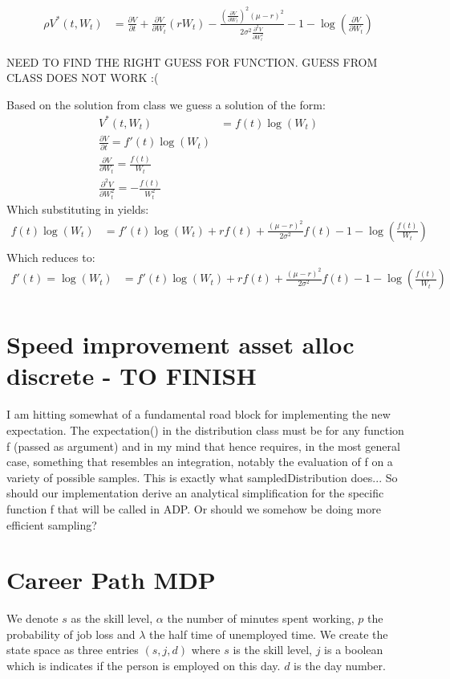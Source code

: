 \documentclass{article}[12pt]
\begin{document}
\begin{align*}
\rho V^*(t,W_t)  &= \frac{\partial V}{\partial t} + \frac{\partial V}{\partial W_t}(rW_t)-\frac{(\frac{\partial V}{\partial W_t})^2(\mu-r)^2}{2\sigma^2\frac{\partial^2 V}{\partial W_t^2}} - 1-\log(\frac{\partial V}{\partial W_t})
\end{align*}

NEED TO FIND THE RIGHT GUESS FOR FUNCTION. GUESS FROM CLASS DOES NOT WORK :( 

Based on the solution from class we guess a solution of the form:
\begin{align*}
V^*(t,W_t) &= f(t)\log(W_t) \\
\frac{\partial V}{\partial t} = f'(t)\log(W_t)\\
\frac{\partial V}{\partial W_t} = \frac{f(t)}{W_t}\\
\frac{\partial^2 V}{\partial W_t^2} = -\frac{f(t)}{W_t^2}
\end{align*}
Which substituting in yields:
\begin{align*}
f(t)\log(W_t) &=  f'(t)\log(W_t) + rf(t)+\frac{(\mu-r)^2}{2\sigma^2}f(t) - 1-\log(\frac{f(t)}{W_t})\\
\end{align*}
Which reduces to:
\begin{align*}
f'(t) = \log(W_t) &=  f'(t)\log(W_t) + rf(t)+\frac{(\mu-r)^2}{2\sigma^2}f(t) - 1-\log(\frac{f(t)}{W_t})\\
\end{align*}


\section{Speed improvement asset alloc discrete - TO FINISH}

I am hitting somewhat of a fundamental road block for implementing the new expectation. The expectation() in the distribution class must be for any function f (passed as argument) and in my mind that hence requires, in the most general case, something that resembles an integration, notably the evaluation of f on a variety of possible samples. This is exactly what sampledDistribution does... So should our implementation derive an analytical simplification for the specific function f that will be called in ADP. Or should we somehow be doing more efficient sampling?

\section{Career Path MDP}
We denote $s$ as the skill level, $\alpha$ the number of minutes spent working, $p$ the probability of job loss and $\lambda$ the half time of unemployed time. We create the state space as three entries $(s,j,d)$ where $s$ is the skill level, $j$ is a boolean which is indicates if the person is employed on this day. $d$ is the day number.
\end{document}
